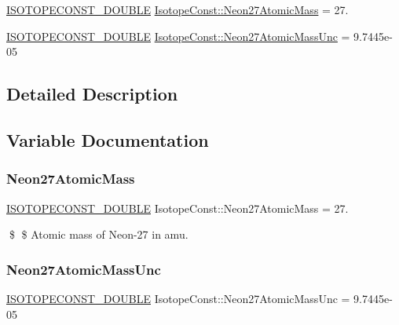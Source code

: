 \begin{DoxyCompactItemize}
\item 
\mbox{\hyperlink{group___isotope_const-_macros_ga8f45a7272ce02c0b4c65c44636ed719a}{I\+S\+O\+T\+O\+P\+E\+C\+O\+N\+S\+T\+\_\+\+D\+O\+U\+B\+LE}} \mbox{\hyperlink{group___isotope_const-_neon-_ne27_gab48e8890696247b26a12dd719f4c54c3}{Isotope\+Const\+::\+Neon27\+Atomic\+Mass}} = 27.
\item 
\mbox{\hyperlink{group___isotope_const-_macros_ga8f45a7272ce02c0b4c65c44636ed719a}{I\+S\+O\+T\+O\+P\+E\+C\+O\+N\+S\+T\+\_\+\+D\+O\+U\+B\+LE}} \mbox{\hyperlink{group___isotope_const-_neon-_ne27_ga8318474fa7d9e67fe0ac849619ea52d0}{Isotope\+Const\+::\+Neon27\+Atomic\+Mass\+Unc}} = 9.\+7445e-\/05
\end{DoxyCompactItemize}


\subsection{Detailed Description}


\subsection{Variable Documentation}
\mbox{\label{group___isotope_const-_neon-_ne27_gab48e8890696247b26a12dd719f4c54c3}} 
\subsubsection{\texorpdfstring{Neon27\+Atomic\+Mass}{Neon27AtomicMass}}
{\footnotesize\ttfamily \mbox{\hyperlink{group___isotope_const-_macros_ga8f45a7272ce02c0b4c65c44636ed719a}{I\+S\+O\+T\+O\+P\+E\+C\+O\+N\+S\+T\+\_\+\+D\+O\+U\+B\+LE}} Isotope\+Const\+::\+Neon27\+Atomic\+Mass = 27.}

\$ \$ Atomic mass of Neon-\/27 in amu. \mbox{\label{group___isotope_const-_neon-_ne27_ga8318474fa7d9e67fe0ac849619ea52d0}} 
\subsubsection{\texorpdfstring{Neon27\+Atomic\+Mass\+Unc}{Neon27AtomicMassUnc}}
{\footnotesize\ttfamily \mbox{\hyperlink{group___isotope_const-_macros_ga8f45a7272ce02c0b4c65c44636ed719a}{I\+S\+O\+T\+O\+P\+E\+C\+O\+N\+S\+T\+\_\+\+D\+O\+U\+B\+LE}} Isotope\+Const\+::\+Neon27\+Atomic\+Mass\+Unc = 9.\+7445e-\/05}

